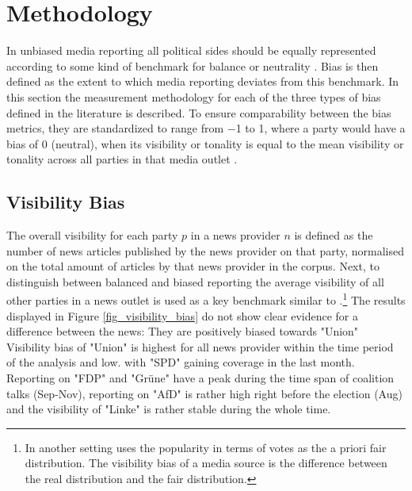 \documentclass[12pt,a4paper,notitlepage]{article}
\begin{document}
\section{Methodology}

In unbiased media reporting all political sides should be equally represented according to some kind of benchmark for balance or neutrality \citep{hopmann_political_2012}. Bias is then defined as the extent to which media reporting deviates from this benchmark. In this section the measurement methodology for each of the three types of bias defined in the literature \citet{junque_de_fortuny_media_2012, eberl_one_2017} is described. To ensure comparability between the bias metrics, they are standardized to range from −1 to 1, where a party would have a bias of 0 (neutral), when its visibility or tonality is equal to the mean visibility or tonality across all parties in that media outlet \citep{eberl_one_2017}.

\subsection{Visibility Bias}


The overall visibility for each party $p$ in a news provider $n$ is defined as the number of news articles published by the news provider on that party, normalised on the total amount of articles by that news provider in the corpus. Next, to distinguish between balanced and biased reporting the average visibility of all other parties in a news outlet is used as a key benchmark similar to \citet{eberl_one_2017}.\footnote{In another setting \citet{junque_de_fortuny_media_2012} uses the popularity in terms of votes as the a priori fair distribution. The visibility bias of a media source is the difference between the real distribution and the fair distribution.} The results displayed in Figure \ref{fig_visibility_bias} do not show clear evidence for a difference between the news: They are positively biased towards "Union"  Visibility bias of "Union" is highest for all news provider within the time period of the analysis and low. with "SPD" gaining coverage in the last month. Reporting on "FDP" and "Grüne" have a peak during the time span of coalition talks (Sep-Nov), reporting on "AfD" is rather high right before the election (Aug) and the visibility of "Linke" is rather stable during the whole time.
\end{document}
